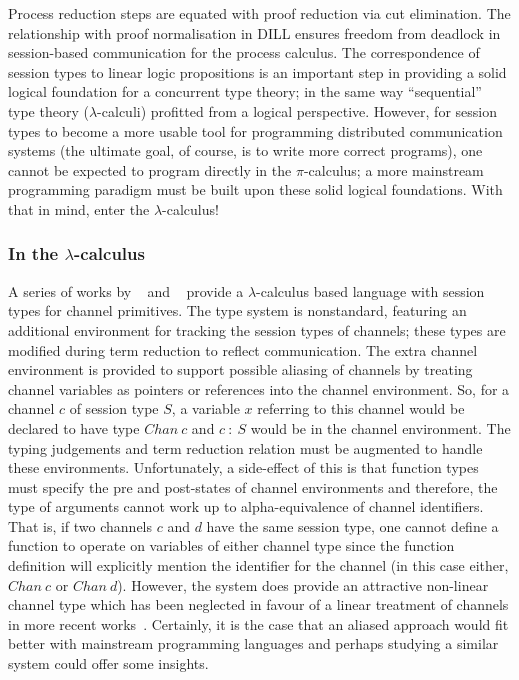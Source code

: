 Process reduction steps are equated with proof reduction via cut
elimination. The relationship with proof normalisation in DILL ensures
freedom from deadlock in session-based communication for the process
calculus. The correspondence of session types to linear logic propositions is
an important step in providing a solid logical foundation for a concurrent
type theory; in the same way ``sequential'' type theory ($\lambda$-calculi)
profitted from a logical perspective. However, for session types to become a
more usable tool for programming distributed communication systems (the
ultimate goal, of course, is to write more correct programs), one cannot be
expected to program directly in the $\pi$-calculus; a more mainstream
programming paradigm must be built upon these solid logical foundations. With
that in mind, enter the $\lambda$-calculus!

\subsubsection{In the \texorpdfstring{$\lambda$}{lambda}-calculus}
\label{sec:lam}

A series of works by \citeauthor{Gay:2003:STI}~\cite{Gay:2003:STI} and
\citeauthor{Vasconcelos:2006:TCM}~\cite{Vasconcelos:2006:TCM} provide a
$\lambda$-calculus based language with session types for channel
primitives. The type system is nonstandard, featuring an additional
environment for tracking the session types of channels; these types are
modified during term reduction to reflect communication. The extra channel
environment is provided to support possible aliasing of channels by treating
channel variables as pointers or references into the channel environment. So,
for a channel $c$ of session type $S$, a variable $x$ referring to this
channel would be declared to have type $Chan~c$ and $c~:~S$ would be in the
channel environment. The typing judgements and term reduction relation must be
augmented to handle these environments. Unfortunately, a side-effect of this
is that function types must specify the pre and post-states of channel
environments and therefore, the type of arguments cannot work up to
alpha-equivalence of channel identifiers. That is, if two channels $c$ and $d$
have the same session type, one cannot define a function to operate on
variables of either channel type since the function definition will explicitly
mention the identifier for the channel (in this case either, $Chan~c$ or
$Chan~d$). However, the system does provide an attractive non-linear channel
type which has been neglected in favour of a linear treatment of channels in
more recent
works~\cite{Gay:2010:LAST,Mazurak:2010:LCC,Wadler:2014}. Certainly, it is the
case that an aliased approach would fit better with mainstream programming
languages and perhaps studying a similar system could offer some insights.

